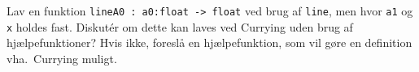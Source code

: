 Lav en funktion \lstinline{lineA0 : a0:float -> float} ved brug af \lstinline{line}, men hvor \lstinline{a1} og \lstinline{x} holdes fast. Diskut\' {e}r om dette kan laves ved Currying uden brug af hjælpefunktioner? Hvis ikke, foreslå en hjælpefunktion, som vil gøre en definition vha.\ Currying muligt.